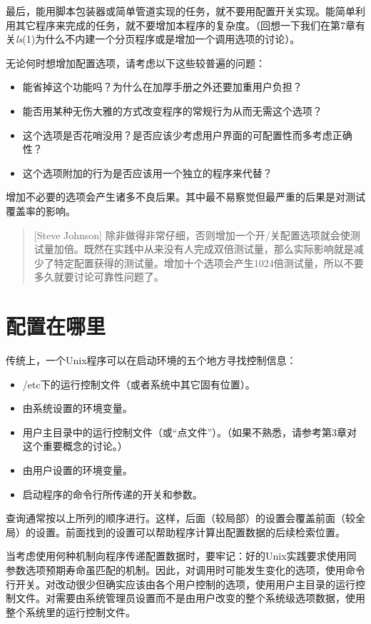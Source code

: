 \documentclass[12pt,oneside]{ctexbook}
\begin{document}
\begin{common-format}
最后，能用脚本包装器或简单管道实现的任务，就不要用配置开关实现。能简单利用其它程序来完成的任务，就不要增加本程序的复杂度。（回想一下我们在第7章有关\textit{ls}(1)为什么不内建一个分页程序或是增加一个调用选项的讨论）。

无论何时想增加配置选项，请考虑以下这些较普遍的问题：
\begin{itemize}
\item  能省掉这个功能吗？为什么在加厚手册之外还要加重用户负担？
\item  能否用某种无伤大雅的方式改变程序的常规行为从而无需这个选项？
\item  这个选项是否花哨没用？是否应该少考虑用户界面的可配置性而多考虑正确性？
\item  这个选项附加的行为是否应该用一个独立的程序来代替？
\end{itemize}

增加不必要的选项会产生诸多不良后果。其中最不易察觉但最严重的后果是对测试覆盖率的影响。
\begin{quote}[Steve Johnson]
除非做得非常仔细，否则增加一个开/关配置选项就会使测试量加倍。既然在实践中从来没有人完成双倍测试量，那么实际影响就是减少了特定配置获得的测试量。增加十个选项会产生1024倍测试量，所以不要多久就要讨论可靠性问题了。
\end{quote}

\section{配置在哪里}
传统上，一个Unix程序可以在启动环境的五个地方寻找控制信息：
\begin{itemize}
\item /etc下的运行控制文件（或者系统中其它固有位置）。
\item 由系统设置的环境变量。
\item 用户主目录中的运行控制文件（或“点文件”）。（如果不熟悉，请参考第3章对这个重要概念的讨论。）
\item 由用户设置的环境变量。
\item 启动程序的命令行所传递的开关和参数。
\end{itemize}

查询通常按以上所列的顺序进行。这样，后面（较局部）的设置会覆盖前面（较全局）的设置。前面找到的设置可以帮助程序计算出配置数据的后续检索位置。

当考虑使用何种机制向程序传递配置数据时，要牢记：好的Unix实践要求使用同参数选项预期寿命虽匹配的机制。因此，对调用时可能发生变化的选项，使用命令行开关。对改动很少但确实应该由各个用户控制的选项，使用用户主目录的运行控制文件。对需要由系统管理员设置而不是由用户改变的整个系统级选项数据，使用整个系统里的运行控制文件。


\end{common-format}
\end{document}
